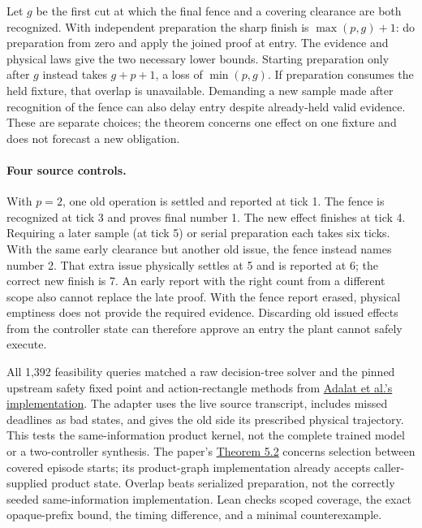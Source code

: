 \documentclass[11pt]{article}
\begin{document}
Let $g$ be the first cut at which the final fence and a covering clearance are both recognized. With independent preparation the sharp finish is $\max(p,g)+1$: do preparation from zero and apply the joined proof at entry. The evidence and physical laws give the two necessary lower bounds. Starting preparation only after $g$ instead takes $g+p+1$, a loss of $\min(p,g)$. If preparation consumes the held fixture, that overlap is unavailable. Demanding a new sample made after recognition of the fence can also delay entry despite already-held valid evidence. These are separate choices; the theorem concerns one effect on one fixture and does not forecast a new obligation.

\paragraph{Four source controls.}
With $p=2$, one old operation is settled and reported at tick 1. The fence is recognized at tick 3 and proves final number 1. The new effect finishes at tick 4. Requiring a later sample (at tick 5) or serial preparation each takes six ticks. With the same early clearance but another old issue, the fence instead names number 2. That extra issue physically settles at 5 and is reported at 6; the correct new finish is 7. An early report with the right count from a different scope also cannot replace the late proof. With the fence report erased, physical emptiness does not provide the required evidence. Discarding old issued effects from the controller state can therefore approve an entry the plant cannot safely execute.

All 1,392 feasibility queries matched a raw decision-tree solver and the pinned upstream safety fixed point and action-rectangle methods from \href{https://github.com/nightly/contract-shielding/blob/07ef8d482325ce8450753cba0276511b81d26ec3/src/shield/_assume_guarantee.py}{Adalat et al.'s implementation}. The adapter uses the live source transcript, includes missed deadlines as bad states, and gives the old side its prescribed physical trajectory. This tests the same-information product kernel, not the complete trained model or a two-controller synthesis. The paper's \href{https://arxiv.org/html/2606.14130v2}{Theorem 5.2} concerns selection between covered episode starts; its product-graph implementation already accepts caller-supplied product state. Overlap beats serialized preparation, not the correctly seeded same-information implementation. Lean checks scoped coverage, the exact opaque-prefix bound, the timing difference, and a minimal counterexample.
\end{document}
